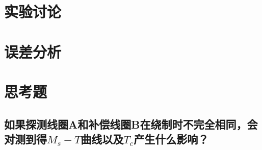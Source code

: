 \documentclass[a4paper]{article}
\begin{document}
\section{实验讨论}

\section{误差分析}

\section{思考题}
\subsection{如果探测线圈A和补偿线圈B在绕制时不完全相同，会对测到得$M_s - T$曲线以及$T_c$产生什么影响？}

\nocite{jiaocai}

\end{document}
